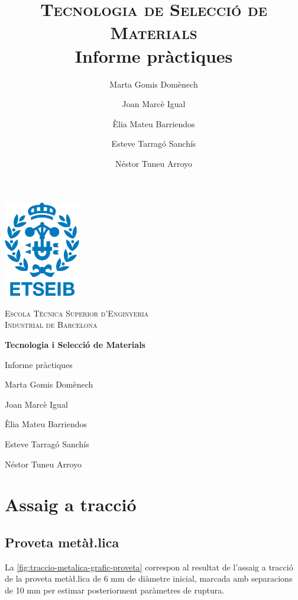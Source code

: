 \documentclass[a4paper]{report}
\title{\textsc{\huge Tecnologia de Selecció de Materials} \\
        Informe pràctiques}
\author{Marta Gomis Domènech \and 
    Joan Marcè Igual \and 
    Èlia Mateu Barriendos \and 
    Esteve Tarragó Sanchís \and 
    Néstor Tuneu Arroyo}
\begin{document}
\begin{titlepage}
    \centering
    \vspace{1cm}
    \includegraphics[width=0.25\textwidth]{images/etseib}
    \par\vspace{1cm}
    \textsc{ \LARGE Escola Tècnica Superior d'Enginyeria \\[1em] 
        Industrial de Barcelona}
    \par\vspace{2cm}
    \textbf{\Huge Tecnologia i Selecció de Materials}
    \par\vspace{2cm}
    {\LARGE Informe pràctiques}
    \vfill
    \begin{flushright}
        \large
        Marta Gomis Domènech \par
        Joan Marcè Igual \par
        Èlia Mateu Barriendos \par
        Esteve Tarragó Sanchís \par
        Néstor Tuneu Arroyo
    \end{flushright}
\end{titlepage}

\tableofcontents

\chapter{Assaig a tracció}

\section{Proveta metà\l.lica }

La \autoref{fig:traccio-metalica-grafic-proveta} correspon al resultat de l'assaig a tracció de la proveta metà\l.lica de 6 mm de diàmetre inicial, marcada amb separacions de 10 mm per estimar posteriorment paràmetres de ruptura. 
\end{document}
